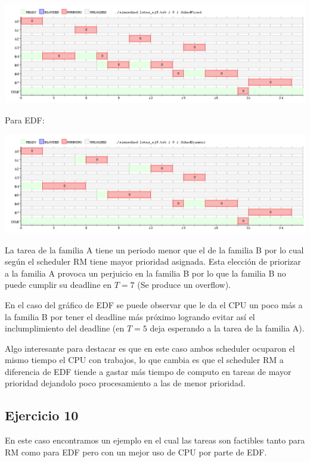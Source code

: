 \begin{center}
\includegraphics[scale=0.4]{graficos/eje9_fixed.png}
\end{center}

Para EDF:

\begin{center}
\includegraphics[scale=0.4]{graficos/eje9_dynamic.png}
\end{center}

La tarea de la familia A tiene un periodo menor que el de la familia B por lo cual según el scheduler RM tiene mayor prioridad asignada. Esta elección de priorizar a la familia A provoca un perjuicio en la familia B por lo que la familia B no puede cumplir su deadline en $T=7$ (Se produce un overflow).

En el caso del gráfico de EDF se puede observar que le da el CPU un poco más a la familia B por tener el deadline más próximo logrando evitar así el inclumplimiento del deadline (en $T=5$ deja esperando a la tarea de la familia A).

Algo interesante para destacar es que en este caso ambos scheduler ocuparon el mismo tiempo el CPU con trabajos, lo que cambia es que el scheduler RM a diferencia de EDF tiende a gastar más tiempo de computo en tareas de mayor prioridad dejandolo poco procesamiento a las de menor prioridad.

\subsection{Ejercicio 10}

En este caso encontramos un ejemplo en el cual las tareas son factibles tanto para RM como para EDF pero con un mejor uso de CPU por parte de EDF.

